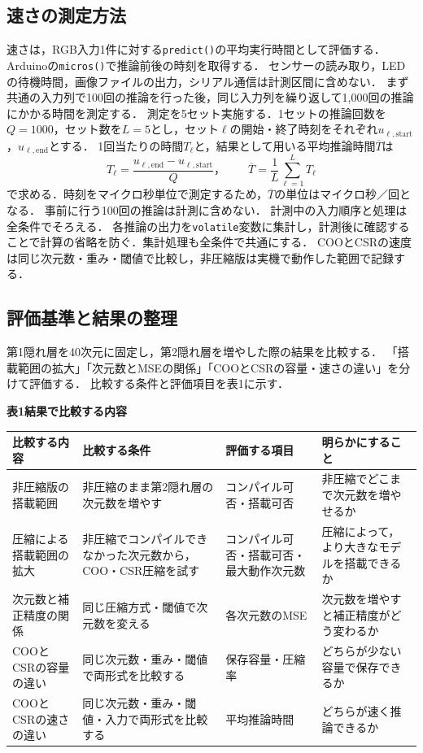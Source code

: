 \documentclass[a4paper,11pt]{article}
\begin{document}
\subsection{速さの測定方法}
速さは，RGB入力1件に対する\texttt{predict()}の平均実行時間として評価する．
Arduinoの\texttt{micros()}で推論前後の時刻を取得する\cite{arduino-micros}．
センサーの読み取り，LEDの待機時間，画像ファイルの出力，シリアル通信は計測区間に含めない．
まず共通の入力列で100回の推論を行った後，同じ入力列を繰り返して1,000回の推論にかかる時間を測定する．
測定を5セット実施する．1セットの推論回数を$Q=1000$，セット数を$L=5$とし，セット$\ell$の開始・終了時刻をそれぞれ$u_{\ell,\mathrm{start}}$，$u_{\ell,\mathrm{end}}$とする．
1回当たりの時間$T_\ell$と，結果として用いる平均推論時間$\overline{T}$は
\[
  T_\ell=\frac{u_{\ell,\mathrm{end}}-u_{\ell,\mathrm{start}}}{Q}，\qquad
  \overline{T}=\frac{1}{L}\sum_{\ell=1}^{L}T_\ell
\]
で求める．時刻をマイクロ秒単位で測定するため，$\overline{T}$の単位はマイクロ秒／回となる．
事前に行う100回の推論は計測に含めない．
計測中の入力順序と処理は全条件でそろえる．
各推論の出力を\texttt{volatile}変数に集計し，計測後に確認することで計算の省略を防ぐ．集計処理も全条件で共通にする．
COOとCSRの速度は同じ次元数・重み・閾値で比較し，非圧縮版は実機で動作した範囲で記録する．

\subsection{評価基準と結果の整理}
第1隠れ層を40次元に固定し，第2隠れ層を増やした際の結果を比較する．
「搭載範囲の拡大」「次元数とMSEの関係」「COOとCSRの容量・速さの違い」を分けて評価する．
比較する条件と評価項目を表1に示す．

\begin{center}
\small
\textbf{表1\quad 結果で比較する内容}\par\medskip
\setlength{\tabcolsep}{3pt}
\renewcommand{\arraystretch}{1.3}
\begin{tabular}{p{24mm}p{50mm}p{30mm}p{38mm}}
\toprule
比較する内容 & 比較する条件 & 評価する項目 & 明らかにすること\\
\midrule
非圧縮版の搭載範囲 & 非圧縮のまま第2隠れ層の次元数を増やす & コンパイル可否・搭載可否 & 非圧縮でどこまで次元数を増やせるか\\
\midrule
圧縮による搭載範囲の拡大 & 非圧縮でコンパイルできなかった次元数から，COO・CSR圧縮を試す & コンパイル可否・搭載可否・最大動作次元数 & 圧縮によって，より大きなモデルを搭載できるか\\
\midrule
次元数と補正精度の関係 & 同じ圧縮方式・閾値で次元数を変える & 各次元数のMSE & 次元数を増やすと補正精度がどう変わるか\\
\midrule
COOとCSRの容量の違い & 同じ次元数・重み・閾値で両形式を比較する & 保存容量・圧縮率 & どちらが少ない容量で保存できるか\\
\midrule
COOとCSRの速さの違い & 同じ次元数・重み・閾値・入力で両形式を比較する & 平均推論時間 & どちらが速く推論できるか\\
\bottomrule
\end{tabular}
\end{center}
\end{document}

